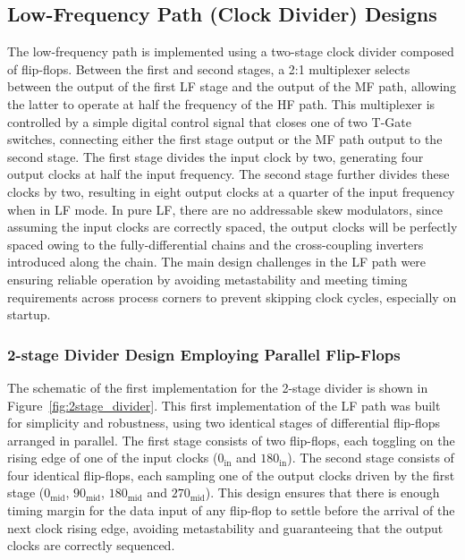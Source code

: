 \subsection{Low-Frequency Path (Clock Divider) Designs}
The low-frequency path is implemented using a two-stage clock divider composed of flip-flops.
Between the first and second stages, a 2:1 multiplexer selects between the output of the first LF stage and the output of the MF path, allowing the latter to operate at half the frequency of the HF path. This multiplexer is controlled by a simple digital control signal that closes one of two T-Gate switches, connecting either the first stage output or the MF path output to the second stage.
The first stage divides the input clock by two, generating four output clocks at half the input frequency. The second stage further divides these clocks by two, resulting in eight output clocks at a quarter of the input frequency when in LF mode.
In pure LF, there are no addressable skew modulators, since assuming the input clocks are correctly spaced, the output clocks will be perfectly spaced owing to the fully-differential chains and the cross-coupling inverters introduced along the chain. The main design challenges in the LF path were ensuring reliable operation by avoiding metastability and meeting timing requirements across process corners to prevent skipping clock cycles, especially on startup.
\subsubsection{2-stage Divider Design Employing Parallel Flip-Flops}
The schematic of the first implementation for the 2-stage divider is shown in Figure~\ref{fig:2stage_divider}.
This first implementation of the LF path was built for simplicity and robustness, using two identical stages of differential flip-flops arranged in parallel. The first stage consists of two flip-flops, each toggling on the rising edge of one of the input clocks (\(0_{\text{in}}\) and \({180}_{\text{in}}\)). The second stage consists of four identical flip-flops, each sampling one of the output clocks driven by the first stage (\(0_{\text{mid}}\), \(90_{\text{mid}}\), \(180_{\text{mid}}\) and \(270_{\text{mid}}\)). This design ensures that there is enough timing margin for the data input of any flip-flop to settle before the arrival of the next clock rising edge, avoiding metastability and guaranteeing that the output clocks are correctly sequenced. 

